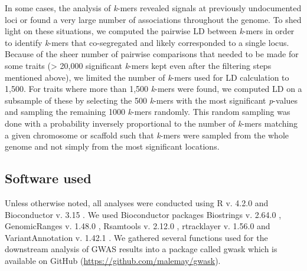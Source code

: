 \documentclass[doublespacing]{bmcart}
\begin{document}
In some cases, the analysis of \emph{k}-mers revealed signals at previously
undocumented loci or found a very large number of associations throughout the
genome. To shed light on these situations, we computed the pairwise LD between
\emph{k}-mers in order to identify \emph{k}-mers that co-segregated and
likely corresponded to a single locus. Because of the sheer number of pairwise
comparisons that needed to be made for some traits (> 20,000 significant
\emph{k}-mers kept even after the filtering steps mentioned above), we limited
the number of \emph{k}-mers used for LD calculation to 1,500. For traits where
more than 1,500 \emph{k}-mers were found, we computed LD on a subsample of
these by selecting the 500 \emph{k}-mers with the most significant
\emph{p}-values and sampling the remaining 1000 \emph{k}-mers randomly. This
random sampling was done with a probability inversely proportional to the
number of \emph{k}-mers matching a given chromosome or scaffold such that
\emph{k}-mers were sampled from the whole genome and not simply from the most
significant locations.

\subsection*{Software used}
\label{sv-gwas-software-used}

Unless otherwise noted, all analyses were conducted using R v. 4.2.0
\citep{r2022} and Bioconductor v. 3.15 \citep{huber2015}. We used Bioconductor
packages Biostrings v. 2.64.0 \citep{pages2022}, GenomicRanges v. 1.48.0
\citep{lawrence2013}, Rsamtools v. 2.12.0 \citep{rsamtools2022}, rtracklayer v.
1.56.0 \citep{lawrence2009} and VariantAnnotation v. 1.42.1
\citep{obenchain2014}.  We gathered several functions used for the downstream
analysis of GWAS results into a package called gwask which is available on
GitHub (\url{https://github.com/malemay/gwask}).


\end{document}
